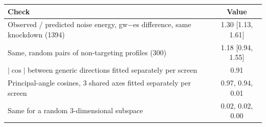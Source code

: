 \begin{tabular}{lc}
\toprule
Check & Value \\
\midrule
Observed / predicted noise energy, gw$-$es difference, same knockdown (1394) & 1.30 [1.13, 1.61] \\
Same, random pairs of non-targeting profiles (300) & 1.18 [0.94, 1.55] \\
$|\cos|$ between generic directions fitted separately per screen & 0.91 \\
Principal-angle cosines, 3 shared axes fitted separately per screen & 0.97, 0.94, 0.01 \\
Same for a random 3-dimensional subspace & 0.02, 0.02, 0.00 \\
\bottomrule
\end{tabular}